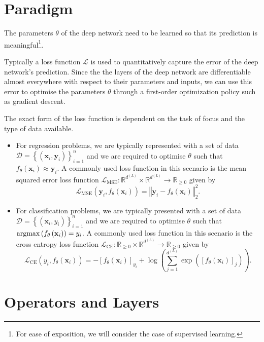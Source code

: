 \section{Paradigm}

The parameters $\theta$ of the deep network need to be learned so that its prediction is meaningful\footnote{For ease of exposition, we will consider the case of supervised learning.}.

Typically a loss function $\mathcal{L}$ is used to quantitatively capture the error of the deep network's prediction. Since the the layers of the deep network are differentiable almost everywhere with respect to their parameters and inputs, we can use this error to optimise the parameters $\theta$ through a first-order optimization policy such as gradient descent.

The exact form of the loss function is dependent on the task of focus and the type of data available.
\begin{itemize}
    \item For regression problems, we are typically represented with a set of data $\mathcal{D}=\left\{\left(\mathbf{x}_i,\mathbf{y}_i\right)\right\}_{i=1}^n$ and we are required to optimise $\theta$ such that $f_{\theta}\left(\mathbf{x}_i\right)\approx\mathbf{y}_i$. A commonly used loss function in this scenario is the mean squared error loss function $\mathcal{L}_{\text{MSE}}:\mathbb{R}^{d^{(L)}}\times\mathbb{R}^{d^{(L)}}\to\mathbb{R}_{\geq0}$ given by $$\mathcal{L}_{\text{MSE}}\left(\mathbf{y}_i,f_{\theta}\left(\mathbf{x}_i\right)\right)=\left\Vert\mathbf{y}_i-f_{\theta}\left(\mathbf{x}_i\right)\right\Vert_2^2.$$
    \item For classification problems, we are typically presented with a set of data $\mathcal{D}=\left\{\left(\mathbf{x}_i,y_i\right)\right\}_{i=1}^n$ and we are required to optimise $\theta$ such that $\operatorname*{\mathrm{argmax}}\left(f_{\theta}\left(\mathbf{x}_i\right)\right)=y_i$. A commonly used loss function in this scenario is the cross entropy loss function $\mathcal{L}_{\text{CE}}:\mathbb{R}_{\geq0}\times\mathbb{R}^{d^{(L)}}\to\mathbb{R}_{\geq0}$ given by $$\mathcal{L}_{\text{CE}}\left(y_i,f_{\theta}\left(\mathbf{x}_i\right)\right)=-\left[f_{\theta}\left(\mathbf{x}_i\right)\right]_{y_i}+\log\left(\sum_{j=1}^{d^{(L)}}\exp\left(\left[f_{\theta}\left(\mathbf{x}_i\right)\right]_j\right)\right).$$
\end{itemize}

\section{Operators and Layers}\label{sec:operators_layesr}

